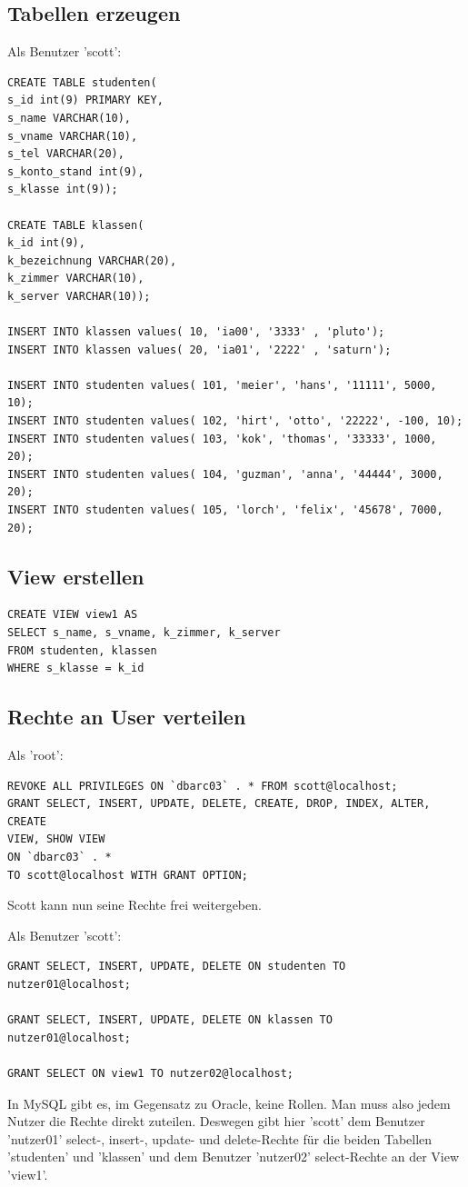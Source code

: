 \documentclass[10pt]{scrreprt}
\begin{document}
\subsection{Tabellen erzeugen}
Als Benutzer 'scott':
\begin{lstlisting}[style=sql]
CREATE TABLE studenten(
s_id int(9) PRIMARY KEY,
s_name VARCHAR(10),
s_vname VARCHAR(10),
s_tel VARCHAR(20),
s_konto_stand int(9),
s_klasse int(9));

CREATE TABLE klassen(
k_id int(9),
k_bezeichnung VARCHAR(20),
k_zimmer VARCHAR(10),
k_server VARCHAR(10));

INSERT INTO klassen values( 10, 'ia00', '3333' , 'pluto');
INSERT INTO klassen values( 20, 'ia01', '2222' , 'saturn');

INSERT INTO studenten values( 101, 'meier', 'hans', '11111', 5000, 10);
INSERT INTO studenten values( 102, 'hirt', 'otto', '22222', -100, 10);
INSERT INTO studenten values( 103, 'kok', 'thomas', '33333', 1000, 20);
INSERT INTO studenten values( 104, 'guzman', 'anna', '44444', 3000, 20);
INSERT INTO studenten values( 105, 'lorch', 'felix', '45678', 7000, 20);
\end{lstlisting}

\subsection{View erstellen}
\begin{lstlisting}[style=sql]
CREATE VIEW view1 AS
SELECT s_name, s_vname, k_zimmer, k_server
FROM studenten, klassen
WHERE s_klasse = k_id
\end{lstlisting}

\subsection{Rechte an User verteilen}
Als 'root':
\begin{lstlisting}[style=sql]
REVOKE ALL PRIVILEGES ON `dbarc03` . * FROM scott@localhost;
GRANT SELECT, INSERT, UPDATE, DELETE, CREATE, DROP, INDEX, ALTER, CREATE
VIEW, SHOW VIEW
ON `dbarc03` . *
TO scott@localhost WITH GRANT OPTION;
\end{lstlisting}
Scott kann nun seine Rechte frei weitergeben.

Als Benutzer 'scott':
\begin{lstlisting}[style=sql]
GRANT SELECT, INSERT, UPDATE, DELETE ON studenten TO
nutzer01@localhost;

GRANT SELECT, INSERT, UPDATE, DELETE ON klassen TO
nutzer01@localhost;

GRANT SELECT ON view1 TO nutzer02@localhost;
\end{lstlisting}
In MySQL gibt es, im Gegensatz zu Oracle, keine Rollen. Man muss also jedem Nutzer die Rechte direkt zuteilen.\newline
Deswegen gibt hier 'scott' dem Benutzer 'nutzer01' select-, insert-, update- und delete-Rechte für die beiden Tabellen 'studenten' und 'klassen' und dem Benutzer 'nutzer02' select-Rechte an der View 'view1'.\newline\newline
\end{document}
